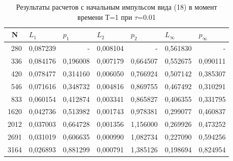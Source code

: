 \documentclass[14pt]{article}
\begin{document}
\begin{table}[H]
\caption{Результаты расчетов с начальным импульсом вида (18) в момент времени Т=1 при $\tau$=0.01}
\begin{tabular}{|r|r|r|r|r|r|r|}
\hline
\multicolumn{1}{|c|}{N} & \multicolumn{1}{l|}{$L_1$}        & \multicolumn{1}{l|}{$p_1$} & \multicolumn{1}{l|}{$L_2$}     & \multicolumn{1}{l|}{$p_2$} & \multicolumn{1}{l|}{$L_\infty$} & \multicolumn{1}{l|}{$p_\infty$} \\ \hline
280                     & 0,087239                         & -                         & 0,008104                      & -    & 0,561830                    & -                           \\ \hline
336                     & 0,084176                         & 0,196008                  & 0,007179                      & 0,664507                  & 0,552675                    & 0,090111                    \\ \hline
420                     & 0,078477                         & 0,314160                  & 0,006050                      & 0,766924                  & 0,507142                    & 0,385307                    \\ \hline
546                     & 0,071616                         & 0,348732                  & 0,004816                      & 0,869755                  & 0,467492                    & 0,310291                    \\ \hline
833                     & 0,060154                         & 0,412874                  & 0,003341                      & 0,865827                  & 0,406355                    & 0,331795                    \\ \hline
1620                    & 0,042736                         & 0,513982                  & 0,001743                      & 0,978381                  & 0,299077                    & 0,460837                    \\ \hline
2012                    & 0,037003                         & 0,664728                  & 0,001356                      & 1,156000                  & 0,269926                    & 0,473252                    \\ \hline
2691                    & 0,031019                         & 0,606635                  & 0,000990                      & 1,082734                  & 0,227090                    & 0,594256                    \\ \hline
3164                    & 0,026893                         & 0,881299                  & 0,000791                      & 1,385126                  & 0,198694                    & 0,824954                    \\ \hline

\end{tabular}
\end{table}
\end{document}

